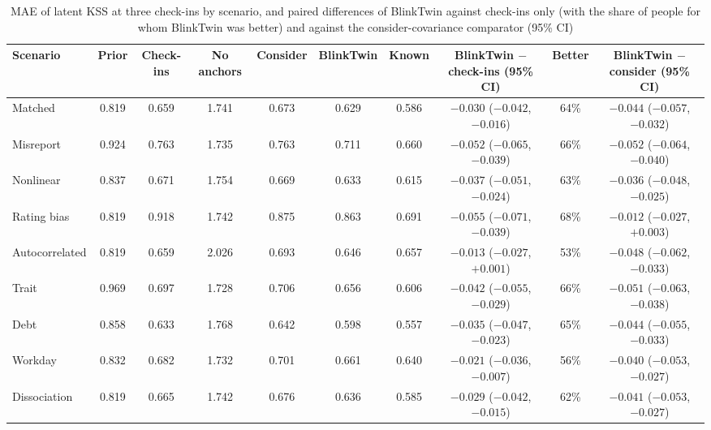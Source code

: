 \begin{table}[t]
  \centering
  \caption{MAE of latent KSS at three check-ins by scenario, and paired differences of BlinkTwin against check-ins only (with the share of people for whom BlinkTwin was better) and against the consider-covariance comparator (95\% CI)}
  \label{tab:appscenarios}
  \footnotesize
  \setlength{\tabcolsep}{3pt}
  \scriptsize
  \begin{tabular}{@{}lccccccccc@{}}
    \toprule
    Scenario & Prior & Check-ins & No anchors & Consider & BlinkTwin & Known & BlinkTwin $-$ check-ins (95\% CI) & Better & BlinkTwin $-$ consider (95\% CI) \\
    \midrule
    Matched & 0.819 & 0.659 & 1.741 & 0.673 & 0.629 & 0.586 & $-0.030$ ($-0.042$, $-0.016$) & 64\% & $-0.044$ ($-0.057$, $-0.032$) \\
    Misreport & 0.924 & 0.763 & 1.735 & 0.763 & 0.711 & 0.660 & $-0.052$ ($-0.065$, $-0.039$) & 66\% & $-0.052$ ($-0.064$, $-0.040$) \\
    Nonlinear & 0.837 & 0.671 & 1.754 & 0.669 & 0.633 & 0.615 & $-0.037$ ($-0.051$, $-0.024$) & 63\% & $-0.036$ ($-0.048$, $-0.025$) \\
    Rating bias & 0.819 & 0.918 & 1.742 & 0.875 & 0.863 & 0.691 & $-0.055$ ($-0.071$, $-0.039$) & 68\% & $-0.012$ ($-0.027$, $+0.003$) \\
    Autocorrelated & 0.819 & 0.659 & 2.026 & 0.693 & 0.646 & 0.657 & $-0.013$ ($-0.027$, $+0.001$) & 53\% & $-0.048$ ($-0.062$, $-0.033$) \\
    Trait & 0.969 & 0.697 & 1.728 & 0.706 & 0.656 & 0.606 & $-0.042$ ($-0.055$, $-0.029$) & 66\% & $-0.051$ ($-0.063$, $-0.038$) \\
    Debt & 0.858 & 0.633 & 1.768 & 0.642 & 0.598 & 0.557 & $-0.035$ ($-0.047$, $-0.023$) & 65\% & $-0.044$ ($-0.055$, $-0.033$) \\
    Workday & 0.832 & 0.682 & 1.732 & 0.701 & 0.661 & 0.640 & $-0.021$ ($-0.036$, $-0.007$) & 56\% & $-0.040$ ($-0.053$, $-0.027$) \\
    Dissociation & 0.819 & 0.665 & 1.742 & 0.676 & 0.636 & 0.585 & $-0.029$ ($-0.042$, $-0.015$) & 62\% & $-0.041$ ($-0.053$, $-0.027$) \\
    \bottomrule
  \end{tabular}
\end{table}

